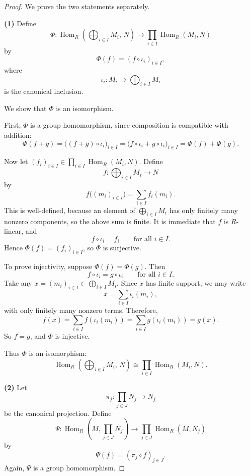 \begin{proof}
    We prove the two statements separately.

    \medskip

    \noindent\textbf{(1)} Define
    \[
        \Phi:\operatorname{Hom}_R\!\left(\bigoplus_{i\in I} M_i,\,N\right)\longrightarrow
        \prod_{i\in I}\operatorname{Hom}_R(M_i,N)
    \]
    by
    \[
        \Phi(f)=(f\circ \iota_i)_{i\in I},
    \]
    where
    \[
        \iota_i:M_i\to \bigoplus_{i\in I} M_i
    \]
    is the canonical inclusion.

    We show that $\Phi$ is an isomorphism.

    First, $\Phi$ is a group homomorphism, since composition is compatible with addition:
    \[
        \Phi(f+g)=\bigl((f+g)\circ \iota_i\bigr)_{i\in I}
        =\bigl(f\circ\iota_i+g\circ\iota_i\bigr)_{i\in I}
        =\Phi(f)+\Phi(g).
    \]

    Now let $(f_i)_{i\in I}\in \prod_{i\in I}\operatorname{Hom}_R(M_i,N)$. Define
    \[
        f:\bigoplus_{i\in I} M_i\to N
    \]
    by
    \[
        f\bigl((m_i)_{i\in I}\bigr)=\sum_{i\in I} f_i(m_i).
    \]
    This is well-defined, because an element of $\bigoplus_{i\in I} M_i$ has only finitely many nonzero components, so the above sum is finite. It is immediate that $f$ is $R$-linear, and
    \[
        f\circ \iota_i=f_i
        \qquad\text{for all } i\in I.
    \]
    Hence $\Phi(f)=(f_i)_{i\in I}$, so $\Phi$ is surjective.

    To prove injectivity, suppose $\Phi(f)=\Phi(g)$. Then
    \[
        f\circ \iota_i=g\circ \iota_i
        \qquad\text{for all } i\in I.
    \]
    Take any $x=(m_i)_{i\in I}\in \bigoplus_{i\in I} M_i$. Since $x$ has finite support, we may write
    \[
        x=\sum_{i\in I} \iota_i(m_i),
    \]
    with only finitely many nonzero terms. Therefore,
    \[
        f(x)=\sum_{i\in I} f(\iota_i(m_i))
        =\sum_{i\in I} g(\iota_i(m_i))
        =g(x).
    \]
    So $f=g$, and $\Phi$ is injective.

    Thus $\Phi$ is an isomorphism:
    \[
        \operatorname{Hom}_R\!\left(\bigoplus_{i\in I} M_i,\,N\right)
        \cong
        \prod_{i\in I}\operatorname{Hom}_R(M_i,N).
    \]

    \medskip

    \noindent\textbf{(2)} Let
    \[
        \pi_j:\prod_{j\in J} N_j\to N_j
    \]
    be the canonical projection. Define
    \[
        \Psi:\operatorname{Hom}_R\!\left(M,\prod_{j\in J} N_j\right)\longrightarrow
        \prod_{j\in J}\operatorname{Hom}_R(M,N_j)
    \]
    by
    \[
        \Psi(f)=(\pi_j\circ f)_{j\in J}.
    \]
    Again, $\Psi$ is a group homomorphism.


\end{proof}
